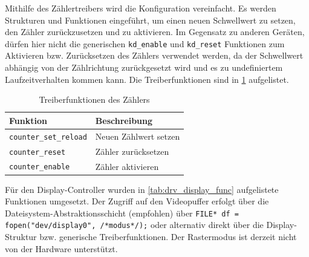 
Mithilfe des Zählertreibers wird die Konfiguration vereinfacht. Es werden Strukturen und Funktionen eingeführt, um einen neuen Schwellwert zu setzen, den Zähler zurückzusetzen und zu aktivieren. Im Gegensatz zu anderen Geräten, dürfen hier nicht die generischen \texttt{kd\_enable} und \texttt{kd\_reset} Funktionen zum Aktivieren bzw. Zurücksetzen des Zählers verwendet werden, da der Schwellwert abhängig von der Zählrichtung zurückgesetzt wird und es zu undefiniertem Laufzeitverhalten kommen kann.
Die Treiberfunktionen sind in \cref{tab:drv_counter_func} aufgelistet.

\begin{table}[!htbp]
	\bigskip
	\centering
	\begin{tabular}{ l | l }
		\textbf{Funktion} & \textbf{Beschreibung} \\
		\hline
		\texttt{counter\_set\_reload} & Neuen Zählwert setzen \\
		\texttt{counter\_reset} & Zähler zurücksetzen \\
		\texttt{counter\_enable} & Zähler aktivieren \\
		\hline
	\end{tabular}
	
	\caption{Treiberfunktionen des Zählers}
	\label{tab:drv_counter_func}
\end{table}


Für den Display-Controller wurden in \cref{tab:drv_display_func} aufgelistete Funktionen umgesetzt. Der Zugriff auf den Videopuffer erfolgt über die Dateisystem-Abstraktionsschicht (empfohlen) über  \texttt{FILE* df = fopen("dev/display0", /*modus*/);} oder alternativ direkt über die Display-Struktur bzw. generische Treiberfunktionen. 
Der Rastermodus ist derzeit nicht von der Hardware unterstützt. 


